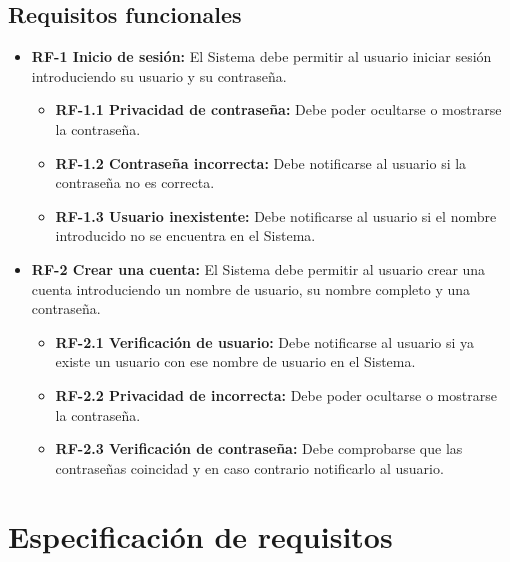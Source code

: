 \subsection{\textbf{Requisitos funcionales}}

\begin{itemize}
    \item \textbf{RF-1 Inicio de sesión:} El Sistema debe permitir al usuario iniciar sesión introduciendo su usuario y su contraseña.
    \begin{itemize}
        \item \textbf{RF-1.1 Privacidad de contraseña:} Debe poder ocultarse o mostrarse la contraseña.
        \item \textbf{RF-1.2 Contraseña incorrecta:} Debe notificarse al usuario si la contraseña no es correcta.
        \item \textbf{RF-1.3 Usuario inexistente:} Debe notificarse al usuario si el nombre introducido no se encuentra en el Sistema.
    \end{itemize}

    \item \textbf{RF-2 Crear una cuenta:} El Sistema debe permitir al usuario crear una cuenta introduciendo un nombre de usuario, su nombre completo y una contraseña.
    \begin{itemize}
        \item \textbf{RF-2.1 Verificación de usuario:} Debe notificarse al usuario si ya existe un usuario con ese nombre de usuario en el Sistema.
        \item \textbf{RF-2.2 Privacidad de incorrecta:} Debe poder ocultarse o mostrarse la contraseña.
        \item \textbf{RF-2.3 Verificación de contraseña:} Debe comprobarse que las contraseñas coincidad y en caso contrario notificarlo al usuario.
    \end{itemize}
\end{itemize}


\section{Especificación de requisitos}


